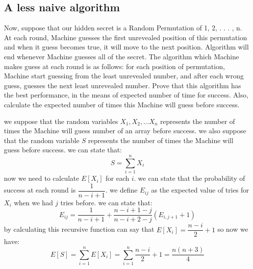 \subsection{A less naive algorithm}
Now, suppose that our hidden secret is a Random Permutation of 1, 2, . . . , n. At each round,
Machine guesses the first unrevealed position of this permutation and when it guess becomes
true, it will move to the next position. Algorithm will end whenever Machine guesses all of
the secret. The algorithm which Machine makes guess at each round is as follows: for each
position of permutation, Machine start guessing from the least unrevealed number, and after
each wrong guess, guesses the next least unrevealed number. Prove that this algorithm has the
best performance, in the means of expected number of time for success. Also, calculate the
expected number of times this Machine will guess before success.
\begin{qsolve}
	\begin{qsolve}[]
		we suppose that the random variables $X_1 , X_2 , \dots X_n$ represents the number of times the Machine will guess number of an array before success. we also suppose that the random variable $S$ represents the number of times the Machine will guess before success. we can state that:
		\splitqsolve[\splitqsolve]
		$$S = \sum_{i=1}^{n} X_i$$
		now we need to calculate $E[X_i]$ for each $i$. we can state that the probability of success at each round is $\dfrac{1}{n-i+1}$. we define $E_{ij}$ as the expected value of tries for $X_i$ when we had $j$ tries before. we can state that:
		$$E_{ij} = \dfrac{1}{n-i+1} + \dfrac{n-i+1-j}{n-i+2-j}(E_{i,j+1}+1)$$
		by calculating this recursive function can say that $E[X_i] = \dfrac{n-i}{2}+1$ so now we have:
		$$E[S] = \sum_{i=1}^{n} E[X_i] = \sum_{i=1}^{n} \dfrac{n-i}{2}+1 = \dfrac{n(n+3)}{4}$$
	\end{qsolve}
\end{qsolve}
